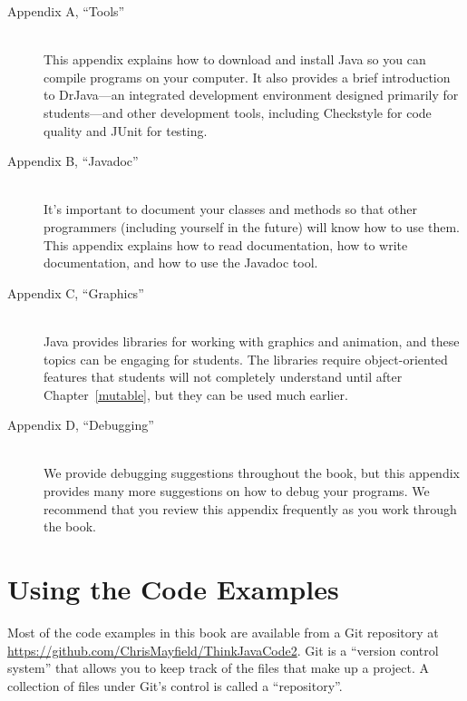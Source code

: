 \begin{description}

\item[Appendix A, ``Tools''] \hfill \\
This appendix explains how to download and install Java so you can compile programs on your computer.
It also provides a brief introduction to DrJava---an integrated development environment designed primarily for students---and other development tools, including Checkstyle for code quality and JUnit for testing.

\item[Appendix B, ``Javadoc''] \hfill \\
It's important to document your classes and methods so that other programmers (including yourself in the future) will know how to use them.
This appendix explains how to read documentation, how to write documentation, and how to use the Javadoc tool.

\item[Appendix C, ``Graphics''] \hfill \\
Java provides libraries for working with graphics and animation, and these topics can be engaging for students.
The libraries require object-oriented features that students will not completely understand until after Chapter~\ref{mutable}, but they can be used much earlier.

\item[Appendix D, ``Debugging''] \hfill \\
We provide debugging suggestions throughout the book, but this appendix provides many more suggestions on how to debug your programs.
We recommend that you review this appendix frequently as you work through the book.


\end{description}


\section*{Using the Code Examples}
\label{code}

Most of the code examples in this book are available from a Git repository at \url{https://github.com/ChrisMayfield/ThinkJavaCode2}.
Git is a ``version control system'' that allows you to keep track of the files that make up a project.
A collection of files under Git's control is called a ``repository''.

